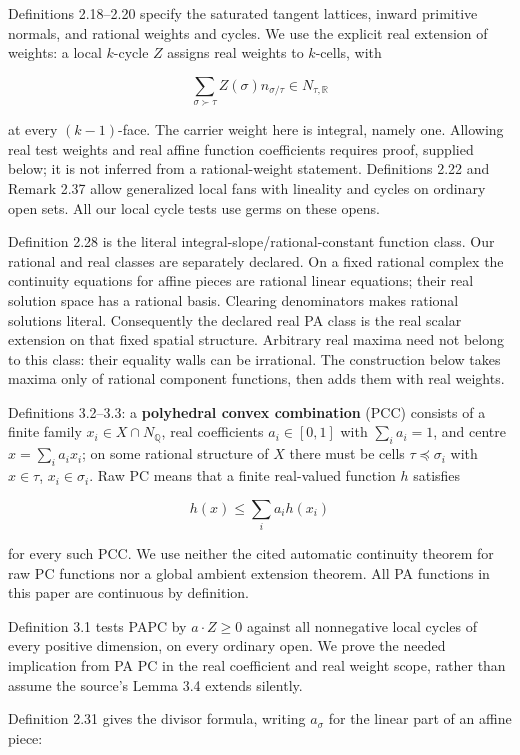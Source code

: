 \documentclass[
  10pt,
]{article}
\begin{document}
Definitions 2.18--2.20 specify the saturated tangent lattices, inward
primitive normals, and rational weights and cycles. We use the explicit
real extension of weights: a local \(k\)-cycle \(Z\) assigns real
weights to \(k\)-cells, with

\[
\sum_{\sigma\succ\tau} Z(\sigma)n_{\sigma/\tau}
\in N_{\tau,\mathbb R}
\]

at every \((k-1)\)-face. The carrier weight here is integral, namely
one. Allowing real test weights and real affine function coefficients
requires proof, supplied below; it is not inferred from a
rational-weight statement. Definitions 2.22 and Remark 2.37 allow
generalized local fans with lineality and cycles on ordinary open sets.
All our local cycle tests use germs on these opens.

Definition 2.28 is the literal integral-slope/rational-constant function
class. Our rational and real classes are separately declared. On a fixed
rational complex the continuity equations for affine pieces are rational
linear equations; their real solution space has a rational basis.
Clearing denominators makes rational solutions literal. Consequently the
declared real PA class is the real scalar extension on that fixed
spatial structure. Arbitrary real maxima need not belong to this class:
their equality walls can be irrational. The construction below takes
maxima only of rational component functions, then adds them with real
weights.

Definitions 3.2--3.3: a \textbf{polyhedral convex combination} (PCC)
consists of a finite family \(x_i\in X\cap N_{\mathbb Q}\), real
coefficients \(a_i\in[0,1]\) with \(\sum_i a_i=1\), and centre
\(x=\sum_i a_i x_i\); on some rational structure of \(X\) there must be
cells \(\tau\preceq\sigma_i\) with \(x\in\tau\), \(x_i\in\sigma_i\). Raw
PC means that a finite real-valued function \(h\) satisfies

\[
h(x)\leq\sum_i a_i h(x_i)
\]

for every such PCC. We use neither the cited automatic continuity
theorem for raw PC functions nor a global ambient extension theorem. All
PA functions in this paper are continuous by definition.

Definition 3.1 tests PAPC by \(a\cdot Z\geq0\) against all nonnegative
local cycles of every positive dimension, on every ordinary open. We
prove the needed implication from PA PC in the real coefficient and real
weight scope, rather than assume the source's Lemma 3.4 extends
silently.

Definition 2.31 gives the divisor formula, writing \(a_\sigma\) for the
linear part of an affine piece:
\end{document}
